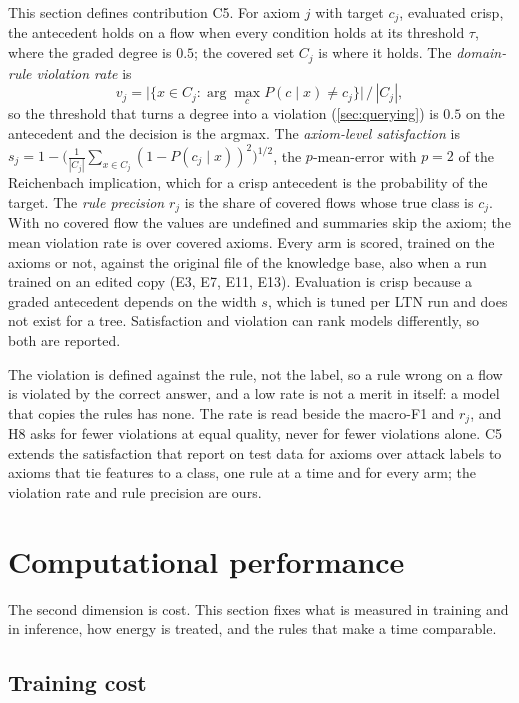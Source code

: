 This section defines contribution C5. For axiom $j$ with target $c_j$, evaluated crisp, the
antecedent holds on a flow when every condition holds at its threshold $\tau$, where the
graded degree is $0.5$; the covered set $C_j$ is where it holds. The \emph{domain-rule
violation rate} is
\[
  v_j = \bigl|\{x\in C_j : \arg\max_c P(c\mid x) \neq c_j\}\bigr| \,/\, |C_j| ,
\]
so the threshold that turns a degree into a violation (\cref{sec:querying}) is $0.5$ on the
antecedent and the decision is the argmax. The \emph{axiom-level satisfaction} is
$s_j = 1 - \bigl(\tfrac{1}{|C_j|}\sum_{x\in C_j}(1 - P(c_j\mid x))^2\bigr)^{1/2}$, the
$p$-mean-error with $p=2$ of the Reichenbach implication, which for a crisp antecedent is the
probability of the target. The \emph{rule precision} $r_j$ is the share of covered flows whose
true class is $c_j$. With no covered flow the values are undefined and summaries skip the
axiom; the mean violation rate is over covered axioms. Every arm is scored, trained on the
axioms or not, against the original file of the knowledge base, also when a run trained on an
edited copy (E3, E7, E11, E13). Evaluation is crisp because a graded antecedent depends on the
width $s$, which is tuned per LTN run and does not exist for a tree. Satisfaction and
violation can rank models differently, so both are reported.

The violation is defined against the rule, not the label, so a rule wrong on a flow is
violated by the correct answer, and a low rate is not a merit in itself: a model that copies
the rules has none. The rate is read beside the macro-F1 and $r_j$, and H8 asks for fewer
violations at equal quality, never for fewer violations alone. C5 extends the satisfaction that
\citet{onchis2022neurosymbolic} report on test data for axioms over attack labels to axioms that tie
features to a class, one rule at a time and for every arm; the violation rate and rule precision are ours.

\section{Computational performance}
\label{sec:cost-dimension}

The second dimension is cost. This section fixes what is measured in training and in
inference, how energy is treated, and the rules that make a time comparable.

\subsection{Training cost}
\label{sec:training-cost}


